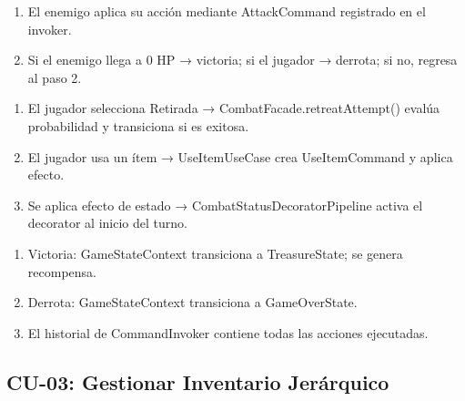 \documentclass[stu,12pt,floatsintext]{apa7}
\begin{document}
\begin{description}
\begin{enumerate}[label=\arabic*.]
            \item El enemigo aplica su acción mediante AttackCommand registrado en el invoker.
            \item Si el enemigo llega a 0 HP → victoria; si el jugador → derrota; si no, regresa al paso 2.
        \end{enumerate}
    \item[Flujo Alternativo:] \hfill
        \begin{enumerate}[label=FA-\arabic*:]
            \item El jugador selecciona Retirada → CombatFacade.retreatAttempt() evalúa probabilidad y transiciona si es exitosa.
            \item El jugador usa un ítem → UseItemUseCase crea UseItemCommand y aplica efecto.
            \item Se aplica efecto de estado → CombatStatusDecoratorPipeline activa el decorator al inicio del turno.
        \end{enumerate}
    \item[Poscondiciones:] \hfill
        \begin{enumerate}[label=\arabic*.]
            \item Victoria: GameStateContext transiciona a TreasureState; se genera recompensa.
            \item Derrota: GameStateContext transiciona a GameOverState.
            \item El historial de CommandInvoker contiene todas las acciones ejecutadas.
        \end{enumerate}
\end{description}


\subsection{CU-03: Gestionar Inventario Jerárquico}
\end{document}
